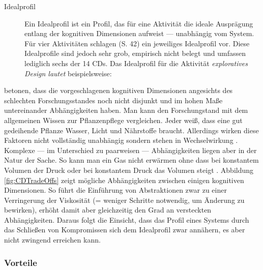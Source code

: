 \begin{important}
\begin{description}
\item[Idealprofil] Ein Idealprofil ist ein Profil, das für eine Aktivität die ideale Ausprägung entlang der kognitiven Dimensionen aufweist --- unabhängig vom System. Für vier Aktivitäten schlagen \cite{GreenCognitive} (S. 42) ein jeweiliges Idealprofil vor. Diese Idealprofile sind jedoch sehr grob, empirisch nicht belegt und umfassen lediglich sechs der 14 CDs. Das Idealprofil für die Aktivität \textit{exploratives Design lautet} beispielsweise:
\end{description}

\cite{carroll2003hci} betonen, dass die vorgeschlagenen kognitiven Dimensionen angesichts des schlechten Forschungsstandes noch nicht disjunkt und im hohen Maße untereinander Abhängigkeiten haben. Man kann den Forschungstand mit dem allgemeinen Wissen zur Pflanzenpflege vergleichen. Jeder weiß, dass eine gut gedeihende Pflanze Wasser, Licht und Nährstoffe braucht. Allerdings wirken diese Faktoren nicht vollständig unabhängig sondern stehen in Wechselwirkung \citep{Green:1989wb}. Komplexe --- im Unterschied zu paarweisen --- Abhängigkeiten liegen aber in der Natur der Sache. So kann man ein Gas nicht erwärmen ohne dass bei konstantem Volumen der Druck oder bei konstantem Druck das Volumen steigt \citep{GreenCognitive}. Abbildung \ref{fig:CDTradeOffs} zeigt mögliche Abhängigkeiten zwischen einigen kognitiven Dimensionen. So führt die Einführung von Abstraktionen zwar zu einer Verringerung der Viskosität (= weniger Schritte notwendig, um Änderung zu bewirken), erhöht damit aber gleichzeitig den Grad an versteckten Abhängigkeiten. Daraus folgt die Einsicht, dass das Profil eines Systems durch das Schließen von Kompromissen sich dem Idealprofil zwar annähern, es aber nicht zwingend erreichen kann.


\subsubsection{Vorteile}


\end{important}
